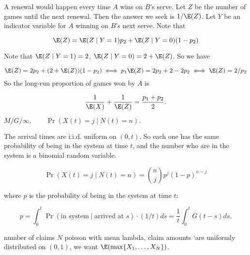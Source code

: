 \begin{solution}
\begin{enumerate}[(a)]
A renewal would happen every time \(A\) wins on \(B\)'s serve. Let \(Z\) be the number of games until the next renewal. Then the answer we seek is \(1/\E(Z)\). Let \(Y\) be an indicator variable for \(A\) winning on \(B\)'s next serve. Note that


\[
\E(Z) =  \E(Z \mid Y = 1) p_2 + \E(Z \mid Y= 0) (1- p_2)
\]

Note that \( \E(Z \mid Y = 1)  = 2\),  \( \E(Z \mid Y = 0)  = 2 + \E(Z) \). So we have

\[
\E(Z) =  2 p_2 + (2 + \E(Z)) (1- p_2) \iff p_1\E(Z) = 2 p_2 + 2 - 2p_2 \iff \E(Z) = 2/p_2
\]
So the long-run proportion of games won by \(A\) is

\[
\frac{1}{\E(X)} + \frac{1}{\E(Z)} = \frac{p_1 + p_2}{2}.
\]

\end{enumerate}

\end{solution}

\begin{exercise} \(M/G/\infty, \qquad \Pr(X(t) = j \mid N(t) = n).\)

\end{exercise}

\begin{solution}





The arrival times are i.i.d. uniform on \((0,t)\). So each one has the same probability of being in the system at time \(t\), and the number who are in the system is a binomial random variable. 

\[
\Pr(X(t) = j \mid N(t) = n) = \binom{n}{j} p^j(1-p)^{n-j}
\]

where \(p\) is the probability of being in the system at time \(t\):

\[
p = \int_0^t \Pr(\text{in system} \mid \text{arrived at } s ) \cdot (1/t) ds = \frac{1}{t} \int_0^t \overline{G}(t-s) ds.
\]


\end{solution}

\begin{exercise}

number of claims \(N\) poisson with mean lambda, claim amounts `are uniformly distributed on \((0,1)\), we want \(\E( \max\{X_1, \ldots, X_N\})\). 

\end{exercise}

